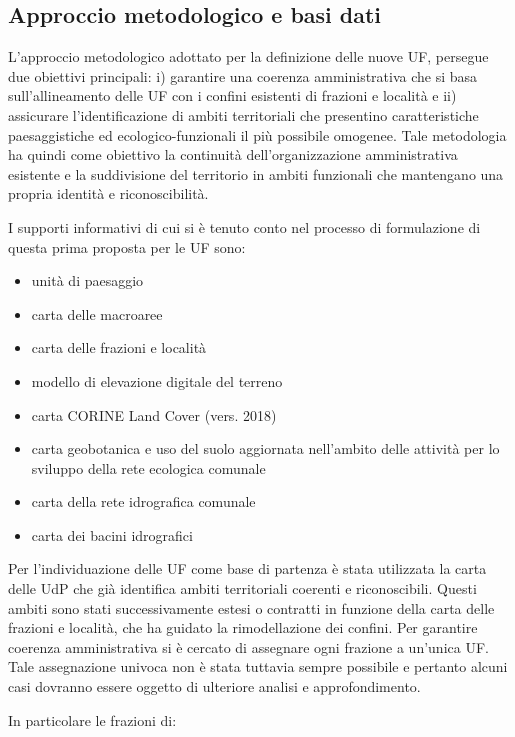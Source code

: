 \documentclass[
  a4paper,
]{book}
\providecommand{\tightlist}{%
  \setlength{\itemsep}{0pt}\setlength{\parskip}{0pt}}
\begin{document}
\subsection{Approccio metodologico e basi dati}\label{approccio-metodologico-e-basi-dati}

L'approccio metodologico adottato per la definizione delle nuove UF, persegue due obiettivi principali: i) garantire una coerenza amministrativa che si basa sull'allineamento delle UF con i confini esistenti di frazioni e località e ii) assicurare l'identificazione di ambiti territoriali che presentino caratteristiche paesaggistiche ed ecologico-funzionali il più possibile omogenee.
Tale metodologia ha quindi come obiettivo la continuità dell'organizzazione amministrativa esistente e la suddivisione del territorio in ambiti funzionali che mantengano una propria identità e riconoscibilità.

I supporti informativi di cui si è tenuto conto nel processo di formulazione di questa prima proposta per le UF sono:

\begin{itemize}
\tightlist
\item
  unità di paesaggio
\item
  carta delle macroaree
\item
  carta delle frazioni e località
\item
  modello di elevazione digitale del terreno
\item
  carta CORINE Land Cover (vers. 2018)
\item
  carta geobotanica e uso del suolo aggiornata nell'ambito delle attività per lo sviluppo della rete ecologica comunale
\item
  carta della rete idrografica comunale
\item
  carta dei bacini idrografici
\end{itemize}

Per l'individuazione delle UF come base di partenza è stata utilizzata la carta delle UdP che già identifica ambiti territoriali coerenti e riconoscibili.
Questi ambiti sono stati successivamente estesi o contratti in funzione della carta delle frazioni e località, che ha guidato la rimodellazione dei confini.
Per garantire coerenza amministrativa si è cercato di assegnare ogni frazione a un'unica UF.
Tale assegnazione univoca non è stata tuttavia sempre possibile e pertanto alcuni casi dovranno essere oggetto di ulteriore analisi e approfondimento.

In particolare le frazioni di:
\end{document}

